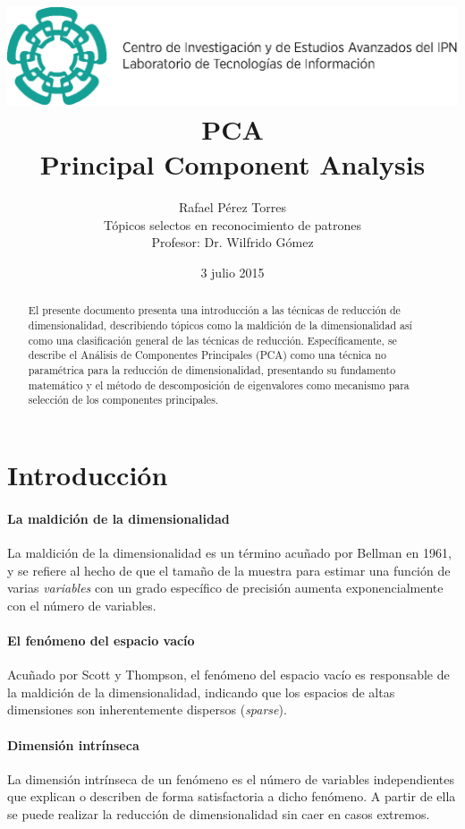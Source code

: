 \documentclass{article}
\title{\includegraphics[width=\columnwidth]{resources/images/cinvestav-header}\\PCA\\Principal Component Analysis}
\author{Rafael Pérez Torres\\Tópicos selectos en reconocimiento de patrones\\Profesor: Dr. Wilfrido Gómez}
\date{3 julio 2015}
\begin{document}
\maketitle

\begin{abstract}
El presente documento presenta una introducción a las técnicas de reducción de dimensionalidad, describiendo tópicos como la maldición de la dimensionalidad así como una clasificación general de las técnicas de reducción.
Específicamente, se describe el Análisis de Componentes Principales (PCA) como una técnica no paramétrica para la reducción de dimensionalidad, presentando su fundamento matemático y el método de descomposición de eigenvalores como mecanismo para selección de los componentes principales.
\end{abstract}

\section{Introducción}

\paragraph{La maldición de la dimensionalidad}
\label{par:la_maldicion_de_la_dimensionalidad}
La maldición de la dimensionalidad es un término acuñado por Bellman en 1961, y se refiere al hecho de que el tamaño de la muestra para estimar una función de varias \emph{variables} con un grado específico de precisión aumenta exponencialmente con el número de variables.

\paragraph{El fenómeno del espacio vacío}
\label{par:el_fenomeno_del_espacio_vacio}
Acuñado por Scott y Thompson, el fenómeno del espacio vacío es responsable de la maldición de la dimensionalidad, indicando que los espacios de altas dimensiones son inherentemente dispersos (\emph{sparse}).

\paragraph{Dimensión intrínseca}
\label{par:dimension_intrinseca}
La dimensión intrínseca de un fenómeno es el número de variables independientes que explican o describen de forma satisfactoria a dicho fenómeno.
A partir de ella se puede realizar la reducción de dimensionalidad sin caer en casos extremos.
\end{document}
